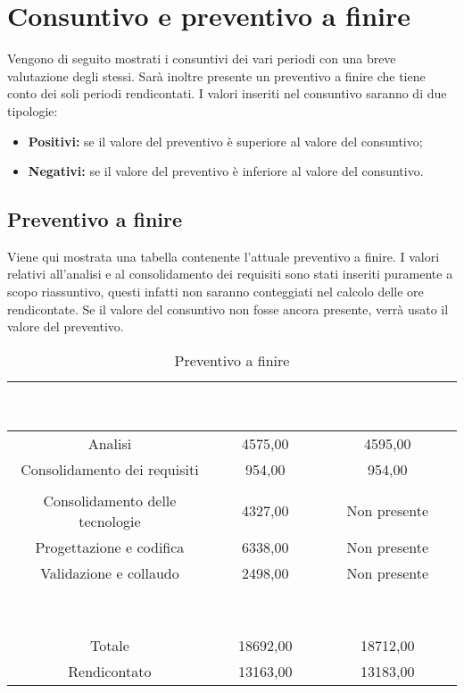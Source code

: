 \section{Consuntivo e preventivo a finire}
\label{consuntivo_preventivo_a_finire}
Vengono di seguito mostrati i consuntivi dei vari periodi con una breve valutazione degli stessi. Sarà inoltre presente un preventivo a finire che tiene conto dei soli periodi rendicontati. I valori inseriti nel consuntivo saranno di due tipologie:
\begin{itemize}
	\item \textbf{Positivi:} se il valore del preventivo è superiore al valore del consuntivo;
	\item \textbf{Negativi:} se il valore del preventivo è inferiore al valore del consuntivo.
\end{itemize}


\subsection{Preventivo a finire}
Viene qui mostrata una tabella contenente l'attuale preventivo a finire. I valori relativi all'analisi e al consolidamento dei requisiti sono stati inseriti puramente a scopo riassuntivo, questi infatti non saranno conteggiati nel calcolo delle ore rendicontate. Se il valore del consuntivo non fosse ancora presente, verrà usato il valore del preventivo.
\begin{table}[H]
	\centering
	\begin{tabular}{|c|c|c|}
	\rowcolor{darkblue} 
		\textcolor{white}{Periodo}		&\textcolor{white}{Preventivo €}&	\textcolor{white}{Consuntivo €}\\ \hline
		Analisi							&	4575,00						&	4595,00 \\ \hline
		Consolidamento dei requisiti	&	954,00						&	954,00 \\ \hline
		\rowcolor{darkblue} \multicolumn{3}{|c|}{\textcolor{white}{Rendicontato}}\\ \hline
		Consolidamento delle tecnologie	&	4327,00						&	Non presente \\ \hline
		Progettazione e codifica		&	6338,00						&	Non presente \\ \hline
		Validazione e collaudo			&	2498,00						&	Non presente \\ \hline
		\rowcolor{darkblue}				&\textcolor{white}{Preventivo €}&	\textcolor{white}{Preventivo a finire €}\\ \hline
		Totale							&	18692,00					&	18712,00 \\ \hline
		Rendicontato					&	13163,00					&	13183,00 \\ \hline
	\end{tabular}
	\caption{Preventivo a finire}
\end{table}